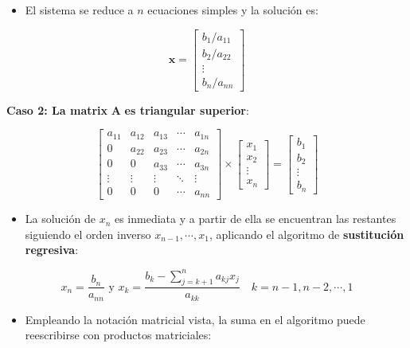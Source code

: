 \documentclass[]{book}
\providecommand{\tightlist}{%
  \setlength{\itemsep}{0pt}\setlength{\parskip}{0pt}}
\begin{document}
\begin{itemize}
\tightlist
\item
  El sistema se reduce a \(n\) ecuaciones simples y la solución es:
\end{itemize}

\[
\mathbf{x} =
\begin{bmatrix}
    b_1/a_{11} \\ b_2/a_{22} \\ \vdots \\ b_n/a_{nn}
\end{bmatrix}
\]

\textbf{Caso 2: La matrix} \(\mathbf{A}\) \textbf{es triangular superior}:

\[
\begin{bmatrix}
a_{11} & a_{12} & a_{13} & \cdots & a_{1n} \\
0 & a_{22} & a_{23} & \cdots & a_{2n} \\
0 & 0 & a_{33} & \cdots & a_{3n} \\
\vdots & \vdots & \vdots & \ddots & \vdots \\
0 & 0 & 0 & \cdots & a_{nn}
\end{bmatrix}
\times 
\begin{bmatrix}
x_1 \\ x_2 \\ \vdots \\ x_n
\end{bmatrix}
=
\begin{bmatrix}
b_1 \\ b_2 \\ \vdots \\ b_n
\end{bmatrix}
\]

\begin{itemize}
\tightlist
\item
  La solución de \(x_n\) es inmediata y a partir de ella se encuentran las restantes siguiendo el orden inverso \(x_{n-1}, \cdots, x_1\), aplicando el algoritmo de \textbf{sustitución regresiva}:
\end{itemize}

\[
x_n = \frac{b_n}{a_{nn}} \text{ y } x_k = \frac{b_k - \sum_{j = k+1}^{n}a_{kj}x_j}{a_{kk}} \quad k = n-1, n-2, \cdots, 1
\]

\begin{itemize}
\tightlist
\item
  Empleando la notación matricial vista, la suma en el algoritmo puede reescribirse con productos matriciales:
\end{itemize}
\end{document}

